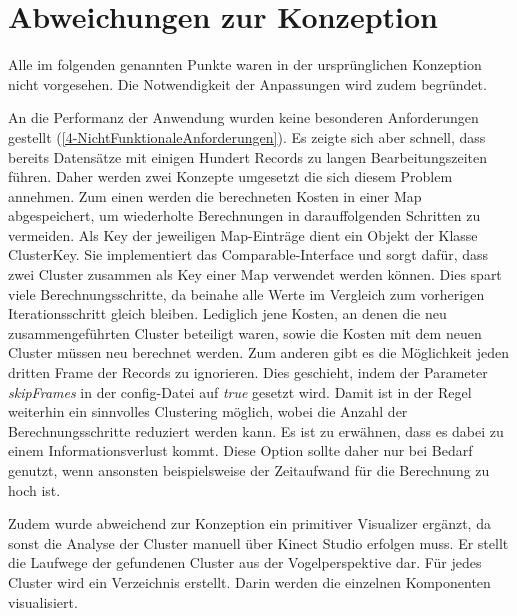 \clearpage
\section{Abweichungen zur Konzeption}
\label{5-AbweichungenKonzeption}
Alle im folgenden genannten Punkte waren in der ursprünglichen Konzeption nicht vorgesehen.
Die Notwendigkeit der Anpassungen wird zudem begründet.

An die Performanz der Anwendung wurden keine besonderen Anforderungen gestellt
(\autoref{4-NichtFunktionaleAnforderungen}).
Es zeigte sich aber schnell, dass bereits Datensätze mit einigen Hundert Records zu langen Bearbeitungszeiten führen.
Daher werden zwei Konzepte umgesetzt die sich diesem Problem annehmen.
Zum einen werden die berechneten Kosten in einer Map abgespeichert,
um wiederholte Berechnungen in darauffolgenden Schritten zu vermeiden.
Als Key der jeweiligen Map-Einträge dient ein Objekt der Klasse ClusterKey.
Sie implementiert das Comparable-Interface und sorgt dafür,
dass zwei Cluster zusammen als Key einer Map verwendet werden können.
Dies spart viele Berechnungsschritte,
da beinahe alle Werte im Vergleich zum vorherigen Iterationsschritt gleich bleiben.
Lediglich jene Kosten, an denen die neu zusammengeführten Cluster beteiligt waren,
sowie die Kosten mit dem neuen Cluster müssen neu berechnet werden.
Zum anderen gibt es die Möglichkeit jeden dritten Frame der Records zu ignorieren.
Dies geschieht, indem der Parameter \emph{skipFrames} in der config-Datei auf \emph{true} gesetzt wird.
Damit ist in der Regel weiterhin ein sinnvolles Clustering möglich,
wobei die Anzahl der Berechnungsschritte reduziert werden kann.
Es ist zu erwähnen, dass es dabei zu einem Informationsverlust kommt.
Diese Option sollte daher nur bei Bedarf genutzt,
wenn ansonsten beispielsweise der Zeitaufwand für die Berechnung zu hoch ist.

Zudem wurde abweichend zur Konzeption ein primitiver Visualizer ergänzt,
da sonst die Analyse der Cluster manuell über Kinect Studio erfolgen muss.
Er stellt die Laufwege der gefundenen Cluster aus der Vogelperspektive dar.
Für jedes Cluster wird ein Verzeichnis erstellt.
Darin werden die einzelnen Komponenten visualisiert.